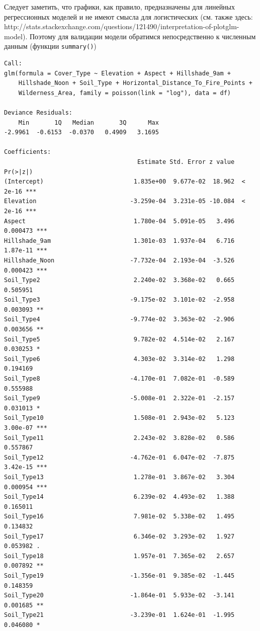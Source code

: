 \documentclass[12pt]{article}
\begin{document}
Следует заметить, что графики, как правило, предназначены для линейных регрессионных моделей и не имеют смысла для логистических
(см. также здесь:\\ http://stats.stackexchange.com/questions/121490/interpretation-of-plotglm-model).
Поэтому для валидации модели обратимся непосредственно к численным данным (функции \verb|summary()|)
\begin{verbatim}
Call:
glm(formula = Cover_Type ~ Elevation + Aspect + Hillshade_9am +
    Hillshade_Noon + Soil_Type + Horizontal_Distance_To_Fire_Points +
    Wilderness_Area, family = poisson(link = "log"), data = df)

Deviance Residuals:
    Min       1Q   Median       3Q      Max
-2.9961  -0.6153  -0.0370   0.4909   3.1695

Coefficients:
                                     Estimate Std. Error z value Pr(>|z|)
(Intercept)                         1.835e+00  9.677e-02  18.962  < 2e-16 ***
Elevation                          -3.259e-04  3.231e-05 -10.084  < 2e-16 ***
Aspect                              1.780e-04  5.091e-05   3.496 0.000473 ***
Hillshade_9am                       1.301e-03  1.937e-04   6.716 1.87e-11 ***
Hillshade_Noon                     -7.732e-04  2.193e-04  -3.526 0.000423 ***
Soil_Type2                          2.240e-02  3.368e-02   0.665 0.505951
Soil_Type3                         -9.175e-02  3.101e-02  -2.958 0.003093 **
Soil_Type4                         -9.774e-02  3.363e-02  -2.906 0.003656 **
Soil_Type5                          9.782e-02  4.514e-02   2.167 0.030253 *
Soil_Type6                          4.303e-02  3.314e-02   1.298 0.194169
Soil_Type8                         -4.170e-01  7.082e-01  -0.589 0.555988
Soil_Type9                         -5.008e-01  2.322e-01  -2.157 0.031013 *
Soil_Type10                         1.508e-01  2.943e-02   5.123 3.00e-07 ***
Soil_Type11                         2.243e-02  3.828e-02   0.586 0.557867
Soil_Type12                        -4.762e-01  6.047e-02  -7.875 3.42e-15 ***
Soil_Type13                         1.278e-01  3.867e-02   3.304 0.000954 ***
Soil_Type14                         6.239e-02  4.493e-02   1.388 0.165011
Soil_Type16                         7.981e-02  5.338e-02   1.495 0.134832
Soil_Type17                         6.346e-02  3.293e-02   1.927 0.053982 .
Soil_Type18                         1.957e-01  7.365e-02   2.657 0.007892 **
Soil_Type19                        -1.356e-01  9.385e-02  -1.445 0.148359
Soil_Type20                        -1.864e-01  5.933e-02  -3.141 0.001685 **
Soil_Type21                        -3.239e-01  1.624e-01  -1.995 0.046080 *

\end{verbatim}
\end{document}
